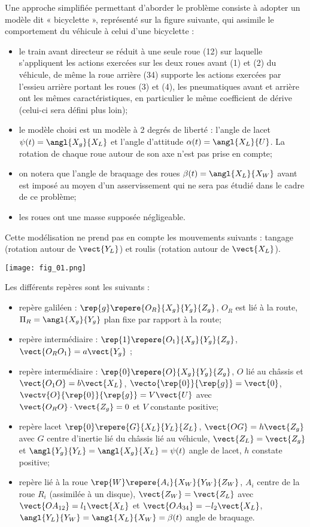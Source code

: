 \ifprof
\else
Une approche simplifiée permettant d'aborder le problème consiste à adopter un
modèle dit « bicyclette », représenté sur la figure suivante, qui assimile le comportement
du véhicule à celui d'une bicyclette :
\begin{itemize}
\item le train avant directeur se réduit à une seule roue (12) sur laquelle s’appliquent
les actions exercées sur les deux roues avant (1) et (2) du véhicule, de
même la roue arrière (34) supporte les actions exercées par l’essieu arrière
portant les roues (3) et (4), les pneumatiques avant et arrière
ont les mêmes caractéristiques, en particulier le même coefficient de dérive
(celui-ci sera défini plus loin);
\item le modèle choisi est un modèle à 2 degrés de liberté : l’angle de lacet
$\psi(t)=\angl{X_g}{X_L}$ et l’angle d’attitude $\alpha(t)=\angl{X_L}{U}$. La rotation de chaque
roue autour de son axe n’est pas prise en compte;
\item on notera que l’angle de braquage des roues $\beta(t)=\angl{X_L}{X_W}$ avant est
imposé au moyen d’un asservissement qui ne sera pas étudié dans le cadre
de ce problème;
\item les roues ont une masse supposée négligeable.
\end{itemize}
Cette modélisation ne prend pas en compte les mouvements suivants : tangage
(rotation autour de $\vect{Y_L}$) et roulis (rotation autour de $\vect{X_L}$).



\begin{marginfigure}
\texttt{[image: fig\_01.png]}
\end{marginfigure}

Les différents repères sont les suivants : 
\begin{itemize}
\item repère galiléen : $\rep{g} \repere{O_R}{X_g}{Y_g}{Z_g}$, $O_R$ est lié à la route, $\Pi_R = \angl{X_g}{Y_g}$ plan fixe par rapport à la route;
\item repère intermédiaire : $\rep{1} \repere{O_1}{X_g}{Y_g}{Z_g}$, $\vect{O_R O_1} = a \vect{Y_g}$ ;
\item repère intermédiaire : $\rep{0} \repere{O}{X_g}{Y_g}{Z_g}$, $O$ lié au châssis et $\vect{O_1 O} = b \vect{X_L}$, $\vecto{\rep{0}}{\rep{g}}=\vect{0}$, $\vectv{O}{\rep{0}}{\rep{g}}=V\vect{U}$ avec $\vect{O_R O}\cdot \vect{Z_g}=0$ 
et $V$ constante positive;
\item repère lacet $\rep{0} \repere{G}{X_L}{Y_L}{Z_L}$, $\vect{OG}=h\vect{Z_g}$ avec $G$ centre d'inertie lié du châssis  
lié au véhicule, $\vect{Z_L}=\vect{Z_g}$ et $\angl{Y_g}{Y_L}=\angl{X_g}{X_L}=\psi(t)$ angle de lacet, $h$ constate positive;
\item repère lié à la roue $\rep{W} \repere{A_i}{X_W}{Y_W}{Z_W}$, $A_i$ centre de la roue $R_i$ (assimilée à un disque), $\vect{Z_W}=\vect{Z_L}$ avec $\vect{OA_{12}}=l_1\vect{X_L}$ et $\vect{OA_{34}}=-l_2\vect{X_L}$, $\angl{Y_L}{Y_W}=\angl{X_L}{X_W}=\beta(t)$ angle de braquage.
\end{itemize}

